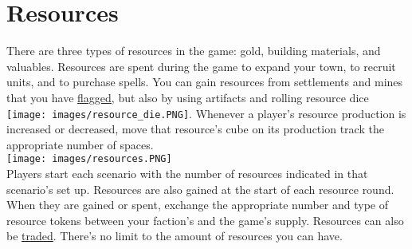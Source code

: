 \documentclass[12pt]{article}
\begin{document}
\clearpage
\section{Resources}
There are three types of resources in the game: gold, building materials, and valuables.
Resources are spent during the game to expand your town, to recruit units, and to purchase spells. You can gain resources from settlements and mines that you have \hyperlink{Categories}{flagged}, but also by using artifacts and rolling resource dice \texttt{[image: images/resource\_die.PNG]}. Whenever a player's resource production is increased or decreased, move that resource's cube on its production track the appropriate number of spaces.\\[6pt]
\texttt{[image: images/resources.PNG]}\\
Players start each scenario with the number of resources indicated in that scenario’s set up.
Resources are also gained at the start of each resource round. When they are gained or spent, exchange the appropriate number and type of resource tokens between your faction's and the game's supply. Resources can also be \hyperlink{Trading}{traded}. There's no limit to the amount of resources you can have.
\end{document}
